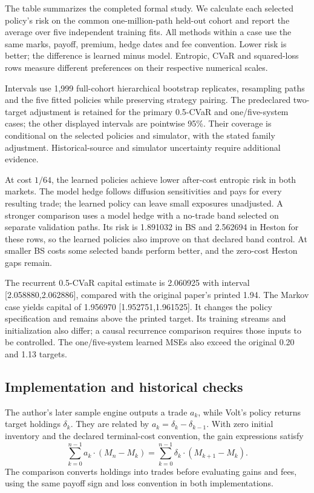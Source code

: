 \documentclass[8pt]{strategynet-journal}
\begin{document}
\begin{SNcolumns}
The table summarizes the completed formal study. We calculate each selected
policy's risk on the common one-million-path held-out cohort and report the
average over five independent training fits. All methods within a case use the
same marks, payoff, premium, hedge dates and fee convention. Lower risk is
better; the difference is learned minus model. Entropic, CVaR and squared-loss
rows measure different preferences on their respective numerical scales.

Intervals use 1,999 full-cohort hierarchical bootstrap replicates, resampling
paths and the five fitted policies while preserving strategy pairing. The
predeclared two-target adjustment is retained for the primary 0.5-CVaR and
one/five-system cases; the other displayed intervals are pointwise 95\%.
Their coverage is conditional on the selected policies and simulator, with
the stated family adjustment. Historical-source and simulator uncertainty
require additional evidence.

At cost $1/64$, the learned policies achieve lower after-cost entropic risk
in both markets. The model hedge follows diffusion sensitivities and pays for every resulting
trade; the learned policy can leave small exposures unadjusted. A stronger
comparison uses a model hedge with a no-trade band selected on separate
validation paths. Its risk is 1.891032 in BS and 2.562694 in Heston for these
rows, so the learned policies also improve on that declared band control.
At smaller BS costs some selected bands perform better, and the zero-cost
Heston gaps remain.

The recurrent 0.5-CVaR capital estimate is 2.060925 with interval
[2.058880,2.062886], compared with the original paper's printed 1.94. The Markov
case yields capital of 1.956970 [1.952751,1.961525]. It changes the policy
specification and remains above the printed target. Its training streams and
initialization also differ; a causal recurrence comparison requires those
inputs to be controlled. The one/five-system learned MSEs also exceed the original 0.20 and 1.13 targets.


\subsection{Implementation and historical checks}
The author's later sample engine outputs a trade
$a_k$, while Volt's policy returns target holdings $\delta_k$. They are related
by $a_k=\delta_k-\delta_{k-1}$. With zero initial inventory and the declared
terminal-cost convention, the gain expressions satisfy
\[
 \sum_{k=0}^{n-1}a_k\cdot(M_n-M_k)
 =\sum_{k=0}^{n-1}\delta_k\cdot(M_{k+1}-M_k).
\]
The comparison converts holdings into trades before evaluating gains and fees,
using the same payoff sign and loss convention in both implementations.


\end{SNcolumns}
\end{document}
